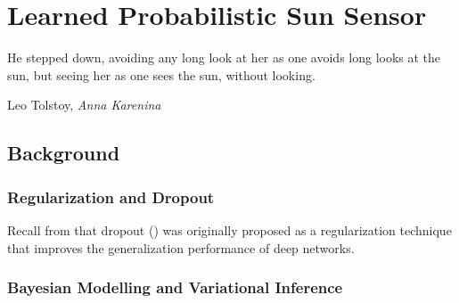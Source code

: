\chapter{Learned Probabilistic Sun Sensor}
\epigraph{He stepped down, avoiding any long look at her as one avoids long looks at the sun, but seeing her as one sees the sun, without looking.}{Leo Tolstoy, \textit{Anna Karenina}}
\label{ch:sun-bcnn}


\section{Background}
\subsection{Regularization and Dropout}
Recall from  that dropout () was originally proposed as a regularization technique that improves the generalization performance of deep networks.

\subsection{Bayesian Modelling and Variational Inference}

